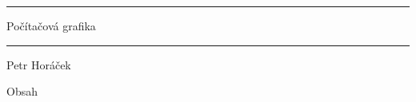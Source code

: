 \nopagenumbers


\hrule width 6in
\tit Počítačová grafika
\hrule width 6in

\vskip 5mm
\hfil Petr Horáček\hfil

\newpage

\nonum\notoc\sec Obsah
\maketoc
\newpage

\pagenumbers
